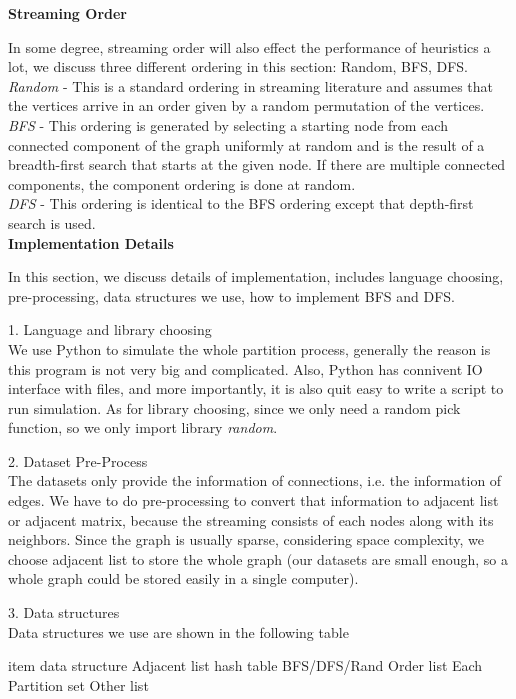 \documentclass[12pt]{article}
\begin{document}
\textbf{Streaming Order}

In some degree, streaming order will also effect the performance of heuristics a lot, we discuss three different ordering in this section: Random, BFS, DFS.\\
\emph{Random} - This is a standard ordering in streaming literature and assumes that the vertices arrive in an
order given by a random permutation of the vertices.\\
\emph{BFS} - This ordering is generated by selecting a starting node from each connected component of the graph
uniformly at random and is the result of a breadth-first search that starts at the given node. If there are multiple
connected components, the component ordering is done at random.\\
\emph{DFS} - This ordering is identical to the BFS ordering except that depth-first search is used.\\


\textbf{Implementation Details}

In this section, we discuss details of implementation, includes language choosing, pre-processing, data structures we use, how to implement BFS and DFS.

1. Language and library choosing\\
We use Python to simulate the whole partition process, generally the reason is this program is not very big and complicated. Also, Python has connivent IO interface with files, and more importantly, it is also quit easy to write a script to run simulation.
As for library choosing, since we only need a random pick function, so we only import library \emph{random}.

2. Dataset Pre-Process\\
The datasets only provide the information of connections, i.e. the information of edges. We have to do pre-processing to convert that information to adjacent list or adjacent matrix, because the streaming consists of each nodes along with its neighbors. Since the graph is usually sparse, considering space complexity, we choose adjacent list to store the whole graph (our datasets are small enough, so a whole graph could be stored easily in a single computer).

3. Data structures\\
Data structures we use are shown in the following table

item                data structure
Adjacent list       hash table
BFS/DFS/Rand Order  list
Each Partition      set
Other               list
\end{document}
